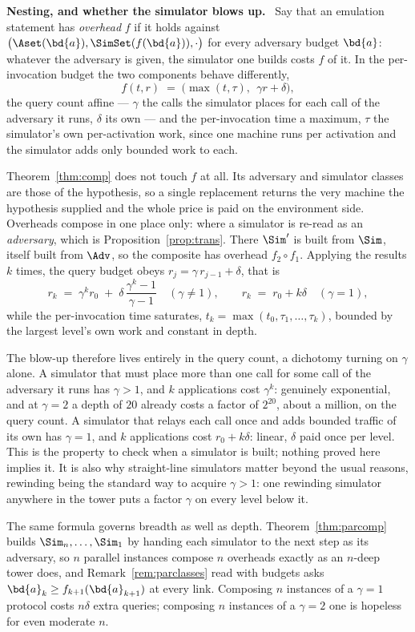 \documentclass[10pt,oneside,openany]{book}
\newcommand{\heading}[1]{\medskip\par\noindent\textcolor{accent}{\textbf{#1.}}\ }
\theoremstyle{accentdef}
\theoremstyle{accentplain}
\begin{document}
\heading{Nesting, and whether the simulator blows up} Say that an emulation statement has
\emph{overhead} $f$ if it holds against $\bigl(\Aset(\bd{a}),\SimSet(f(\bd{a})),\cdot\bigr)$ for
every adversary budget $\bd{a}$: whatever the adversary is given, the simulator one builds costs
$f$ of it. In the per-invocation budget the two components behave differently,
\[
  f(t,r) \;=\; \bigl(\max(t,\tau),\ \ \gamma r + \delta\bigr) ,
\]
the query count affine --- $\gamma$ the calls the simulator places for each call of the adversary
it runs, $\delta$ its own --- and the per-invocation time a maximum, $\tau$ the simulator's own
per-activation work, since one machine runs per activation and the simulator adds only bounded
work to each.

Theorem~\ref{thm:comp} does not touch $f$ at all. Its adversary and simulator classes are those
of the hypothesis, so a single replacement returns the very machine the hypothesis supplied and
the whole price is paid on the environment side. Overheads compose in one place only: where a
simulator is re-read as an \emph{adversary}, which is Proposition~\ref{prop:trans}. There $\Sim'$
is built from $\Sim$, itself built from $\Adv$, so the composite has overhead $f_2 \circ f_1$.
Applying the results $k$ times, the query budget obeys $r_j = \gamma\, r_{j-1} + \delta$, that is
\[
  r_k \;=\; \gamma^{k} r_0 \;+\; \delta\,\frac{\gamma^{k}-1}{\gamma-1}
  \quad (\gamma \neq 1),
  \qquad
  r_k \;=\; r_0 + k\delta \quad (\gamma = 1) ,
\]
while the per-invocation time saturates, $t_k = \max(t_0, \tau_1, \dots, \tau_k)$, bounded by the
largest level's own work and constant in depth.

The blow-up therefore lives entirely in the query count, a dichotomy turning on $\gamma$ alone. A
simulator that must place more than one call for some call of the adversary it runs has
$\gamma > 1$, and $k$ applications cost $\gamma^k$: genuinely exponential, and at $\gamma = 2$ a
depth of $20$ already costs a factor of $2^{20}$, about a million, on the query count. A simulator
that relays each call once and adds bounded traffic of its own has $\gamma = 1$, and $k$
applications cost $r_0 + k\delta$: linear, $\delta$ paid once per level. This is the property to
check when a simulator is built; nothing proved here implies it. It is also why straight-line
simulators matter beyond the usual reasons, rewinding being the standard way to acquire
$\gamma > 1$: one rewinding simulator anywhere in the tower puts a factor $\gamma$ on every level
below it.

The same formula governs breadth as well as depth. Theorem~\ref{thm:parcomp} builds
$\Sim_n,\dots,\Sim_1$ by handing each simulator to the next step as its adversary, so $n$
parallel instances compose $n$ overheads exactly as an $n$-deep tower does, and
Remark~\ref{rem:parclasses} read with budgets asks $\bd{a}_k \geq f_{k+1}(\bd{a}_{k+1})$ at every
link. Composing $n$ instances of a $\gamma = 1$ protocol costs $n\delta$ extra queries; composing
$n$ instances of a $\gamma = 2$ one is hopeless for even moderate $n$.
\end{document}
